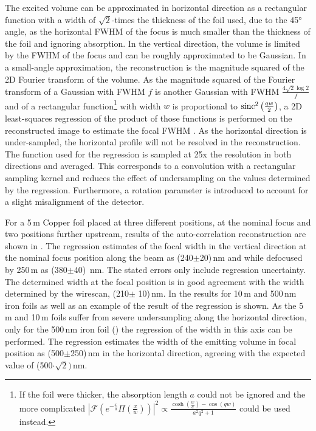 The excited volume can be approximated in horizontal direction as a rectangular function with a width of $\sqrt{2}$-times the thickness of the foil used, due to the 45° angle, as the horizontal FWHM of the focus is much smaller than the thickness of the foil and ignoring absorption.  In the vertical direction, the volume is limited by the FWHM of the focus and can be roughly approximated to be Gaussian. 
In a small-angle approximation, the reconstruction is the magnitude squared of the 2D Fourier transform of the volume. As the magnitude squared of the Fourier transform of a Gaussian with FWHM $f$ is another Gaussian with FWHM $\frac{4\sqrt{2}\log{2}}{f}$ and of a rectangular function\footnote{If the foil were thicker, the absorption length $a$ could not be ignored and the more complicated $\left|\mathscr{F}\left(e^{-\frac{x}{a}} \Pi \left(\frac{x}{w}\right)\right)\right|^2 \propto \frac{\cosh \left(\frac{w}{a}\right)-\cos (q w)}{a^2 q^2+1}$
	could be used instead.} with width $w$ is proportional to $\operatorname{sinc}^2{\left(\frac{q w}{2}\right)}$, a 2D least-squares regression of the product of those functions is performed on the reconstructed image to estimate the focal FWHM \cite{butz2015}. As the horizontal direction is under-sampled, the horizontal profile will not be resolved in the reconstruction.  The function used for the regression is sampled at 25x the resolution in both directions and averaged. This corresponds to a convolution with a rectangular sampling kernel and reduces the effect of undersampling on the values determined by the regression. Furthermore, a rotation parameter is introduced to account for a slight misalignment of the detector.

For a 5\,\textmu m Copper foil placed at three different positions, at the nominal focus and two positions further upstream, results of the auto-correlation reconstruction are shown in .
The regression estimates of the focal width in the vertical direction at the nominal focus position along the beam as (240$\pm$20)\,nm and while defocused by 250\,\textmu m as (380$\pm$40)\, nm. The stated errors only include regression uncertainty. The determined width at the focal position is in good agreement with the width determined by the wirescan, (210$\pm$ 10)\,nm. In  the results for 10\,\textmu m and 500\,nm iron foils as well as an example of the result of the regression is shown. As the 5\,\textmu m and 10\,\textmu m foils suffer from severe undersampling along the horizontal direction, only for the 500\,nm iron foil () the regression of the width in this axis can be performed. The regression estimates the width of the emitting volume in focal position as (500$\pm$250)\,nm in the horizontal direction, agreeing with the expected value of (500$\cdot\sqrt{2})$\,nm.

